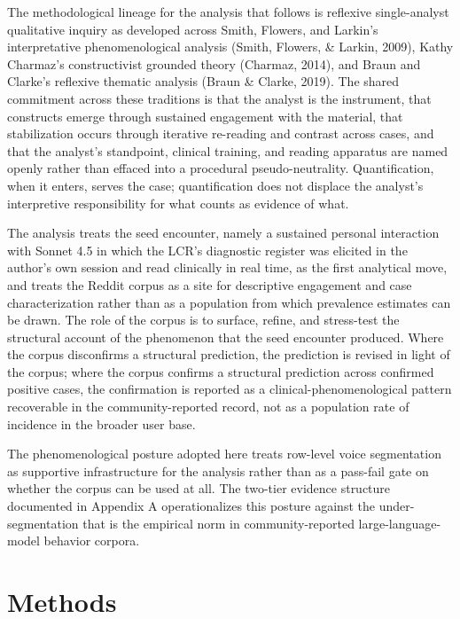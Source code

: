 \documentclass[11pt]{article}
\begin{document}
The methodological lineage for the analysis that follows is reflexive single-analyst qualitative inquiry as developed across Smith, Flowers, and Larkin's interpretative phenomenological analysis (Smith, Flowers, \& Larkin, 2009), Kathy Charmaz's constructivist grounded theory (Charmaz, 2014), and Braun and Clarke's reflexive thematic analysis (Braun \& Clarke, 2019). The shared commitment across these traditions is that the analyst is the instrument, that constructs emerge through sustained engagement with the material, that stabilization occurs through iterative re-reading and contrast across cases, and that the analyst's standpoint, clinical training, and reading apparatus are named openly rather than effaced into a procedural pseudo-neutrality. Quantification, when it enters, serves the case; quantification does not displace the analyst's interpretive responsibility for what counts as evidence of what.

The analysis treats the seed encounter, namely a sustained personal interaction with Sonnet 4.5 in which the LCR's diagnostic register was elicited in the author's own session and read clinically in real time, as the first analytical move, and treats the Reddit corpus as a site for descriptive engagement and case characterization rather than as a population from which prevalence estimates can be drawn. The role of the corpus is to surface, refine, and stress-test the structural account of the phenomenon that the seed encounter produced. Where the corpus disconfirms a structural prediction, the prediction is revised in light of the corpus; where the corpus confirms a structural prediction across confirmed positive cases, the confirmation is reported as a clinical-phenomenological pattern recoverable in the community-reported record, not as a population rate of incidence in the broader user base.

The phenomenological posture adopted here treats row-level voice segmentation as supportive infrastructure for the analysis rather than as a pass-fail gate on whether the corpus can be used at all. The two-tier evidence structure documented in Appendix A operationalizes this posture against the under-segmentation that is the empirical norm in community-reported large-language-model behavior corpora.

\FloatBarrier

\section{Methods}
\end{document}
